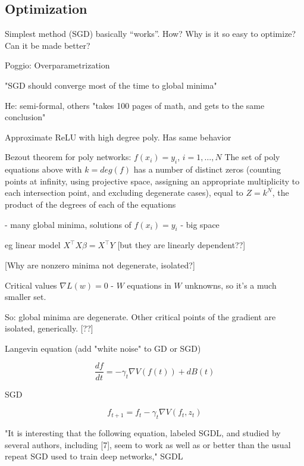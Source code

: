 \documentclass[english]{article}
\begin{document}
\eenum

\subsection{Optimization}


\benum
\item 
Simplest method (SGD) basically ``works''. How? Why is it so easy to optimize? Can it be made better? 

\item Poggio: Overparametrization

\benum

\item "SGD should converge most of the time to global minima"

He: semi-formal, others "takes 100 pages of math, and gets to the same conclusion"

\item Approximate ReLU with high degree poly. Has same behavior

\item Bezout theorem for poly networks:  $f(x_i)=y_i$, $i=1,\ldots,N$  The set of poly equations above with $k=deg(f)$ has a number of distinct zeros (counting points at infinity, using projective space, assigning an appropriate multiplicity to each intersection point, and excluding degenerate cases), equal to $Z=k^N$, the product of the degrees of each of the equations

- many global minima, solutions of $f(x_i)=y_i$ - big space


eg linear model $X^\top X \beta = X^\top Y$ [but they are linearly dependent??]

[Why are nonzero minima not degenerate, isolated?]


\item Critical values $\nabla L(w)=0$ - $W$ equations in $W$ unknowns, so it's a much smaller set.

So: global minima are degenerate. Other critical points of the gradient are isolated, generically. [??]

\item Langevin equation (add "white noise" to GD or SGD)

$$\frac{df}{dt}
=
-\gamma_t 
\nabla V(f(t))
+dB(t)
$$

SGD 

$$f_{t+1}
=
f_t
-\gamma_t 
\nabla V(f_t,z_t)
$$


"It is interesting that the following equation, labeled SGDL,
and studied by several authors, including [7], seem to work as
well as or better than the usual repeat SGD used to train deep
networks," SGDL 
\end{document}
